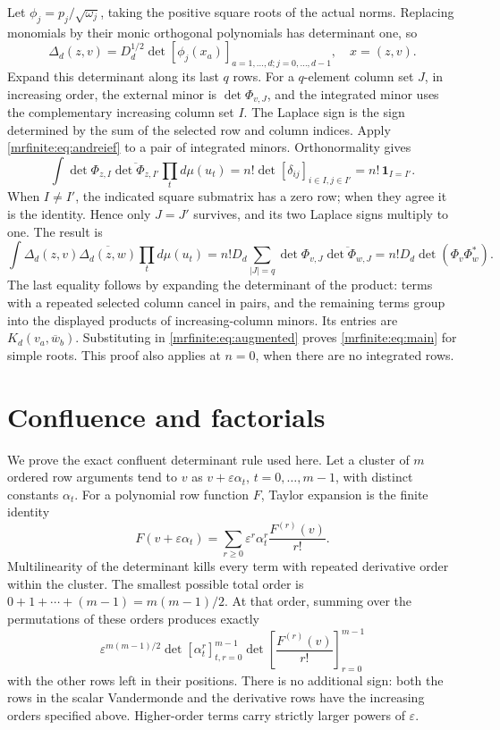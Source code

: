 Let \(\phi_j=p_j/\sqrt{\omega_j}\), taking the positive square roots of
the actual norms. Replacing monomials by their monic orthogonal
polynomials has determinant one, so
\[
 \Delta_d(z,v)=D_d^{1/2}\det[\phi_j(x_a)]_{a=1,\ldots,d; j=0,\ldots,d-1},
 \quad x=(z,v).
\]
Expand this determinant along its last \(q\) rows. For a \(q\)-element
column set \(J\), in increasing order, the external minor is
\(\det\Phi_{v,J}\), and the integrated minor uses the complementary
increasing column set \(I\). The Laplace sign is the sign determined by
the sum of the selected row and column indices. Apply
\eqref{mrfinite:eq:andreief} to a pair of integrated minors. Orthonormality gives
\[
 \int\det\Phi_{z,I}\overline{\det\Phi_{z,I'}}\prod_t d\mu(u_t)
   =n!\det[\delta_{ij}]_{i\in I,j\in I'}
   =n!\,\mathbf1_{I=I'}.
\]
When \(I\ne I'\), the indicated square submatrix has a zero row;
when they agree it is the identity. Hence only \(J=J'\) survives, and
its two Laplace signs multiply to one. The result is
\[
 \int\Delta_d(z,v)\overline{\Delta_d(z,w)}\prod_t d\mu(u_t)
  =n!D_d\sum_{|J|=q}\det\Phi_{v,J}\overline{\det\Phi_{w,J}}
  =n!D_d\det(\Phi_v\Phi_w^*).
\]
The last equality follows by expanding the determinant of the product:
terms with a repeated selected column cancel in pairs, and the remaining
terms group into the displayed products of increasing-column minors.
Its entries are \(K_d(v_a,\overline w_b)\). Substituting in
\eqref{mrfinite:eq:augmented} proves \eqref{mrfinite:eq:main} for simple roots. This proof
also applies at \(n=0\), when there are no integrated rows.

\section{Confluence and factorials}\label{mrfinite:sec:confluence}

We prove the exact confluent determinant rule used here. Let a cluster
of \(m\) ordered row arguments tend to \(v\) as
\(v+\varepsilon\alpha_t\), \(t=0,\ldots,m-1\), with distinct constants
\(\alpha_t\). For a polynomial row function \(F\), Taylor expansion is
the finite identity
\[
 F(v+\varepsilon\alpha_t)
  =\sum_{r\geq0}\varepsilon^r\alpha_t^r\frac{F^{(r)}(v)}{r!}.
\]
Multilinearity of the determinant kills every term with repeated
derivative order within the cluster. The smallest possible total order
is \(0+1+\cdots+(m-1)=m(m-1)/2\). At that order, summing over the
permutations of these orders produces exactly
\[
 \varepsilon^{m(m-1)/2}
  \det[\alpha_t^r]_{t,r=0}^{m-1}
  \det\left[\frac{F^{(r)}(v)}{r!}\right]_{r=0}^{m-1}
\]
with the other rows left in their positions. There is no additional
sign: both the rows in the scalar Vandermonde and the derivative rows
have the increasing orders specified above. Higher-order terms carry
strictly larger powers of \(\varepsilon\).

